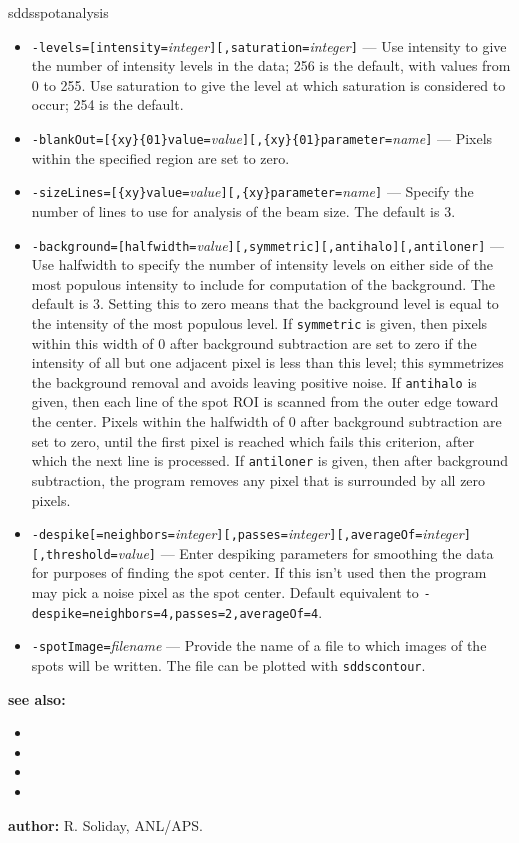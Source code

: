 \begin{sddsprog}{sddsspotanalysis}
\begin{itemize}
      \item \verb|-levels=[intensity=|{\em integer}\verb|][,saturation=|{\em integer}\verb|]| --- Use intensity to give the number of intensity levels in the data; 256 is the default, with values from 0 to 255. Use saturation to give the level at which saturation is considered to occur; 254 is the default.
      \item \verb|-blankOut=[{xy}{01}value=|{\em value}\verb|][,{xy}{01}parameter=|{\em name}\verb|]| --- Pixels within the specified region are set to zero.
      \item \verb|-sizeLines=[{xy}value=|{\em value}\verb|][,{xy}parameter=|{\em name}\verb|]| --- Specify the number of lines to use for analysis of the beam size. The default is 3.
      \item \verb|-background=[halfwidth=|{\em value}\verb|][,symmetric][,antihalo][,antiloner]| --- Use halfwidth to specify the number of intensity levels on either side of the most populous intensity to include for computation of the background. The default is 3. Setting this to zero means that the background level is equal to the intensity of the most populous level. If \verb|symmetric| is given, then pixels within this width of 0 after background subtraction are set to zero if the intensity of all but one adjacent pixel is less than this level; this symmetrizes the background removal and avoids leaving positive noise. If \verb|antihalo| is given, then each line of the spot ROI is scanned from the outer edge toward the center. Pixels within the halfwidth of 0 after background subtraction are set to zero, until the first pixel is reached which fails this criterion, after which the next line is processed. If \verb|antiloner| is given, then after background subtraction, the program removes any pixel that is surrounded by all zero pixels.
      \item \verb|-despike[=neighbors=|{\em integer}\verb|][,passes=|{\em integer}\verb|][,averageOf=|{\em integer}\verb|][,threshold=|{\em value}\verb|]| --- Enter despiking parameters for smoothing the data for purposes of finding the spot center. If this isn't used then the program may pick a noise pixel as the spot center. Default equivalent to \verb|-despike=neighbors=4,passes=2,averageOf=4|.
      \item \verb|-spotImage=|{\em filename} --- Provide the name of a file to which images of the spots will be written. The file can be plotted with \verb|sddscontour|.
    \end{itemize}
  \item \textbf{see also:}
    \begin{itemize}
      \item {}
      \item {}
      \item {}
      \item {}
    \end{itemize}
  \item \textbf{author:} R. Soliday, ANL/APS.
\end{sddsprog}

